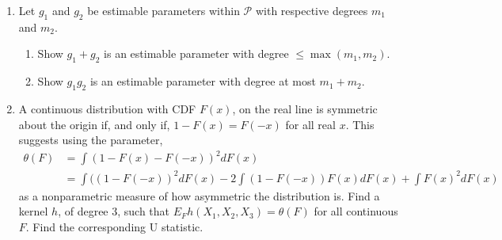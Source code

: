 \documentclass[11pt]{article}
\begin{document}
\begin{enumerate}
	\item Let $g_1$ and $g_2$ be estimable parameters within $\mathcal{P}$ with respective degrees $m_1$ and $m_2$.
	\begin{enumerate}
		\item Show $g_1 + g_2$ is an estimable parameter with degree $\leq  \max(m_1, m_2)$. 
		\item  Show
		$g_1 g_2$ is an estimable parameter with degree at most $m_1 + m_2$.
	\end{enumerate}
\item A continuous distribution with CDF $F(x)$, on the real line is symmetric about the origin if,
and only if, $1 - F(x) = F(-x)$ for all real $x$. This suggests using the parameter,
\begin{align}
\theta(F)&=\int(1-F(x)-F(-x))^2dF(x)\\
&=\int((1-F(-x))^2dF(x)-2\int(1-F(-x))F(x)dF(x)+\int F(x)^2dF(x)
\end{align}
as a nonparametric measure of how asymmetric the distribution is. Find a kernel $h$, of degree
$3$, such that $E_F h(X_1, X_2, X_3) = \theta(F)$ for all continuous $F$. Find the corresponding U statistic.
\end{enumerate}
\end{document}
